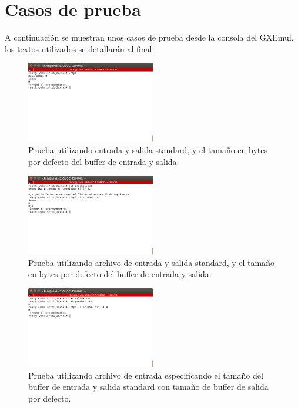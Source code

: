 \documentclass[a4paper]{article}
\begin{document}
\section{Casos de prueba}

A continuación se muestran unos casos de prueba desde la consola del GXEmul, los textos utilizados se detallarán al final.


\begin{figure}[!htp]
\begin{center}
\includegraphics[width=0.5\textwidth]{imagenes_casosDePrueba_tp1/prueba0.png}
\caption{Prueba utilizando entrada y salida standard, y el tamaño en bytes por defecto del buffer de entrada y salida.} \label{fig001}
\end{center}
\end{figure}

\begin{figure}[!htp]
\begin{center}
\includegraphics[width=0.5\textwidth]{imagenes_casosDePrueba_tp1/prueba_1archivoDeEntrada.png}
\caption{Prueba utilizando archivo de entrada y salida standard, y el tamaño en bytes por defecto del buffer de entrada y salida.} \label{fig001}
\end{center}
\end{figure}

\begin{figure}[!htp]
\begin{center}
\includegraphics[width=0.5\textwidth]{imagenes_casosDePrueba_tp1/prueba2_entrada_4.png}
\caption{Prueba utilizando archivo de entrada especificando el tamaño del buffer de entrada y salida standard con tamaño de buffer de salida por defecto.} \label{fig001}
\end{center}
\end{figure}
\end{document}

